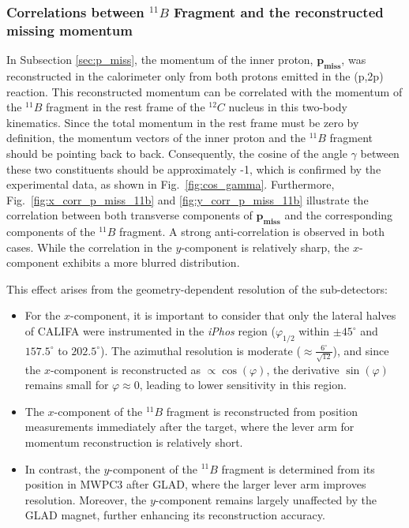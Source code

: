 \subsubsection{Correlations between $^{11}B$ Fragment and the reconstructed missing momentum}
In Subsection \ref{sec:p_miss}, the momentum of the inner proton, $\mathbf{p_{miss}}$, was reconstructed in the calorimeter only from both protons emitted in the (p,2p) reaction. This reconstructed momentum can be correlated with the momentum of the $^{11}B$ fragment in the rest frame of the $^{12}C$ nucleus in this two-body kinematics.\newline
Since the total momentum in the rest frame must be zero by definition, the momentum vectors of the inner proton and the $^{11}B$ fragment should be pointing back to back. Consequently, the cosine of the angle $\gamma$ between these two constituents should be approximately -1, which is confirmed by the experimental data, as shown in Fig.~\ref{fig:cos_gamma}.\newline
Furthermore, Fig.~\ref{fig:x_corr_p_miss_11b} and \ref{fig:y_corr_p_miss_11b} illustrate the correlation between both transverse components of $\mathbf{p_{miss}}$ and the corresponding components of the $^{11}B$ fragment. A strong anti-correlation is observed in both cases. While the correlation in the $y$-component is relatively sharp, the $x$-component exhibits a more blurred distribution.\newline

This effect arises from the geometry-dependent resolution of the sub-detectors:
\begin{itemize}
\item[--]For the $x$-component, it is important to consider that only the lateral halves of CALIFA were instrumented in the \textit{iPhos} region ($\varphi_{1/2}$ within $\pm 45^{\circ}$ and $157.5^{\circ}$ to $202.5^{\circ}$). The azimuthal resolution is moderate ($\approx \frac{6^{\circ}}{\sqrt{12}}$), and since the $x$-component is reconstructed as $\propto \cos(\varphi)$, the derivative $\sin(\varphi)$ remains small for $\varphi \approx 0$, leading to lower sensitivity in this region.
\item[--] The $x$-component of the $^{11}B$ fragment is reconstructed from position measurements immediately after the target, where the lever arm for momentum reconstruction is relatively short.
\item[--]In contrast, the $y$-component of the $^{11}B$ fragment is determined from its position in MWPC3 after GLAD, where the larger lever arm improves resolution. Moreover, the $y$-component remains largely unaffected by the GLAD magnet, further enhancing its reconstruction accuracy.
\end{itemize}

